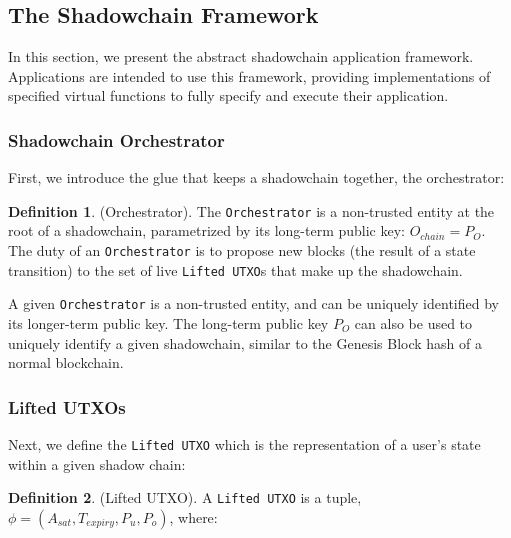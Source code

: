 \documentclass[12pt,a4paper]{article}
\theoremstyle{definition}
\newtheorem{definition}{Definition}[section]
\begin{document}

\subsection{The Shadowchain Framework}

In this section, we present the abstract shadowchain application framework.
Applications are intended to use this framework, providing implementations of
specified virtual functions to fully specify and execute their application.

\subsubsection{Shadowchain Orchestrator}

First, we introduce the glue that keeps a shadowchain together, the
orchestrator:

\theoremstyle{definition}
\begin{definition}{(Orchestrator).} The \texttt{Orchestrator} is a non-trusted
    entity at the root of a shadowchain, parametrized by its long-term public
    key: $O_{chain} = P_{O}$. The duty of an \texttt{Orchestrator} is to
    propose new blocks (the result of a state transition) to the set of live
    \texttt{Lifted UTXO}s that make up the shadowchain.
\end{definition}

A given \texttt{Orchestrator} is a non-trusted entity, and can be uniquely
identified by its longer-term public key. The long-term public key $P_{O}$ can
also be used to uniquely identify a given shadowchain, similar to the Genesis
Block hash of a normal blockchain.

\subsubsection{Lifted UTXOs}

Next, we define the \texttt{Lifted UTXO} which is the representation of a
user's state within a given shadow chain:

\begin{definition}{(Lifted UTXO).} A \texttt{Lifted UTXO} is a tuple,
    $ \phi = (A_{sat}, T_{expiry}, P_{u}, P_{o})$, where:
\end{definition}
\end{document}
